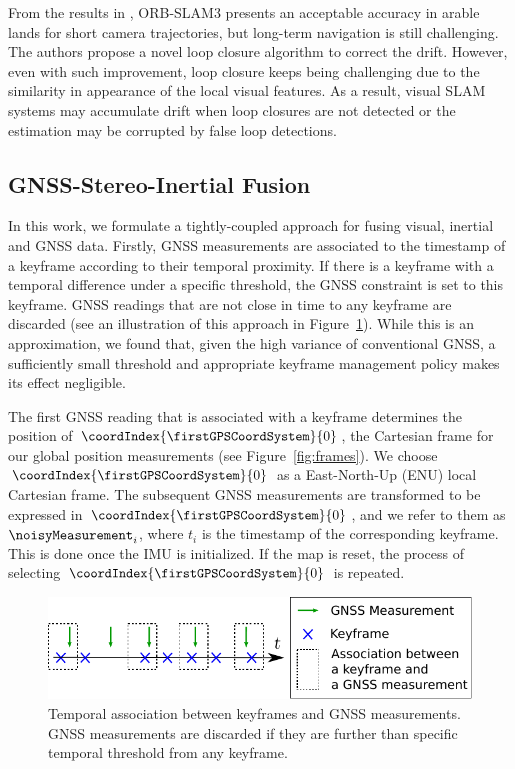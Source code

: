 From the results in \cite{cremona2022evaluation}, ORB-SLAM3 presents an acceptable accuracy in arable lands for short camera trajectories, but long-term navigation is still challenging. The authors propose a novel loop closure algorithm to correct the drift. However, even with such improvement, loop closure keeps being challenging due to the similarity in appearance of the local visual features. As a result, visual SLAM systems may accumulate drift when loop closures are not detected or the estimation may be corrupted by false loop detections.

\subsection{GNSS-Stereo-Inertial Fusion}
In this work, we formulate a tightly-coupled approach for fusing visual, inertial and GNSS data. Firstly, GNSS measurements are associated to the timestamp of a keyframe according to their temporal proximity. If there is a keyframe with a temporal difference under a specific threshold, the GNSS constraint is set to this keyframe. GNSS readings that are not close in time to any keyframe are discarded (see an illustration of this approach in Figure~\ref{fig:association}). While this is an approximation, we found that, given the high variance of conventional GNSS, a sufficiently small threshold and appropriate keyframe management policy makes its effect negligible. 

The first GNSS reading that is associated with a keyframe determines the position of $\coordIndex{\firstGPSCoordSystem}{0}$, the Cartesian frame for our global position measurements (see Figure~\ref{fig:frames}). We choose $\coordIndex{\firstGPSCoordSystem}{0}$ as a East-North-Up (ENU) local Cartesian frame. The subsequent GNSS measurements are transformed to be expressed in $\coordIndex{\firstGPSCoordSystem}{0}$, and we refer to them as $\noisyMeasurement_{i}$, where $t_i$ is the timestamp of the corresponding keyframe. This is done once the IMU is initialized. If the map is reset, the process of selecting $\coordIndex{\firstGPSCoordSystem}{0}$ is repeated. 

\begin{figure}[!t]
    \centering
    \includegraphics[width=\linewidth]{images/association.pdf}
    \caption{Temporal association between keyframes and GNSS measurements. %
    GNSS measurements are discarded if they are further than specific temporal threshold from any keyframe.}
    \label{fig:association}
\end{figure}

